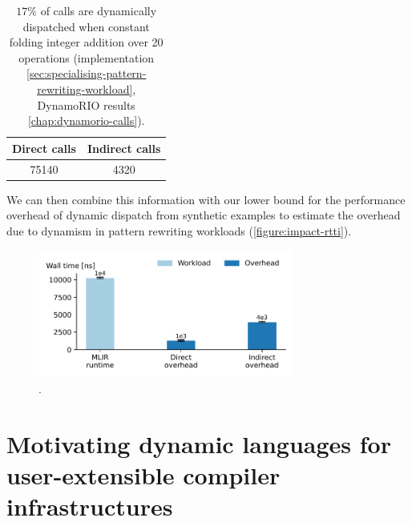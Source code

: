 \begin{table}[H]
  \caption{$17\%$ of calls are dynamically dispatched when constant folding integer addition over 20 operations (implementation \autoref{sec:specialising-pattern-rewriting-workload}, DynamoRIO results \autoref{chap:dynamorio-calls}).}
  \label{tab:dynamorio-constant-folding}
  \centering
  \begin{tabular}{cc}
    \toprule
    \textbf{Direct calls} & \textbf{Indirect calls}\\
    \midrule
    75140 & 4320 \\
    \bottomrule
  \end{tabular}
\end{table}

We can then combine this information with our lower bound for the performance overhead of dynamic dispatch from synthetic examples to estimate the overhead due to dynamism in pattern rewriting workloads (\autoref{figure:impact-rtti}).

\begin{figure}[H]
    \centering
    \includegraphics[width=0.75\textwidth]{images/impact_dynamism/pattern.pdf}
    \caption{.}
    \label{figure:impact-rtti}
\end{figure}



\section{Motivating dynamic languages for user-extensible compiler infrastructures}
\label{chap:dynamism-pattern-rewriting-motivating}

